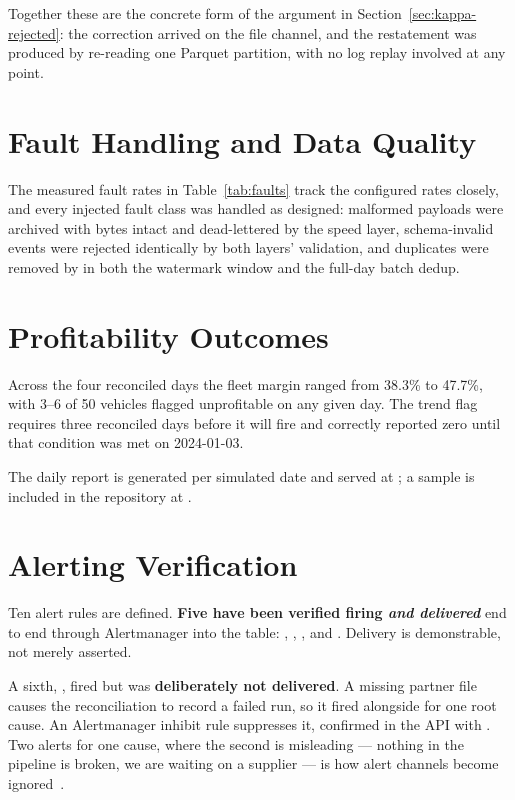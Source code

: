 Together these are the concrete form of the argument in
Section~\ref{sec:kappa-rejected}: the correction arrived on the file
channel, and the restatement was produced by re-reading one Parquet
partition, with no log replay involved at any point.

\section{Fault Handling and Data Quality}

The measured fault rates in Table~\ref{tab:faults} track the configured
rates closely, and every injected fault class was handled as designed:
malformed payloads were archived with bytes intact and dead-lettered by
the speed layer, schema-invalid events were rejected identically by both
layers' validation, and duplicates were removed by  in
both the watermark window and the full-day batch dedup.

\section{Profitability Outcomes}

Across the four reconciled days the fleet margin ranged from 38.3\% to
47.7\%, with 3--6 of 50 vehicles flagged unprofitable on any given day.
The  trend flag requires three reconciled
days before it will fire and correctly reported zero until that condition
was met on 2024-01-03.

The daily report is generated per simulated date and served at
; a sample is included in the repository
at .

\section{Alerting Verification}
\label{sec:alerting-results}

Ten alert rules are defined. \textbf{Five have been verified firing
\emph{and delivered}} end to end through Alertmanager into the
 table: ,
, , 
and . Delivery is demonstrable, not merely asserted.

A sixth, , fired but was \textbf{deliberately not
delivered}. A missing partner file causes the reconciliation to record a
failed run, so it fired alongside  for one root
cause. An Alertmanager inhibit rule suppresses it, confirmed in the API
with . Two alerts for one cause, where the second
is misleading --- nothing in the pipeline is broken, we are waiting on a
supplier --- is how alert channels become
ignored~\cite{beyer2016sre}.

